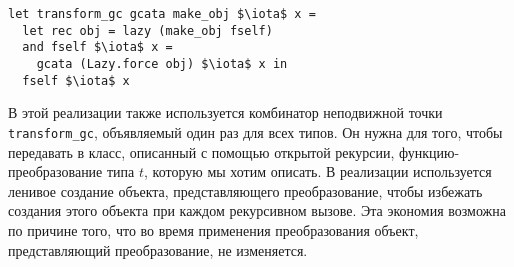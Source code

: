 \begin{lstlisting}
let transform_gc gcata make_obj $\iota$ x =
  let rec obj = lazy (make_obj fself)
  and fself $\iota$ x = 
    gcata (Lazy.force obj) $\iota$ x in
  fself $\iota$ x
\end{lstlisting}

\noindent В этой реализации также используется комбинатор неподвижной точки \lstinline{transform_gc}, объявляемый один раз для всех типов. Он нужна для того, чтобы передавать в класс, описанный с помощью открытой рекурсии, функцию-преобразование типа $t$, которую мы хотим описать. В реализации используется ленивое создание объекта, представляющего преобразование, чтобы избежать создания этого объекта при каждом рекурсивном вызове. Эта экономия возможна по причине того, что во время применения преобразования объект, представляющий преобразование, не изменяется.



%
%
%
%
%

